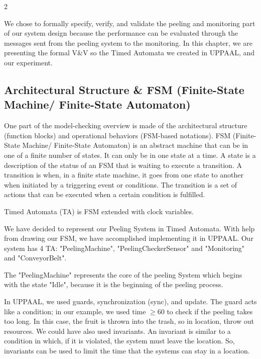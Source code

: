 \documentclass{article}
\begin{document}
\begin{multicols}{2}

\color{black}

We chose to formally specify, verify, and validate the peeling and monitoring part of our system design because the performance can be evaluated through the messages sent from the peeling system to the monitoring.
In this chapter, we are presenting the formal V\&V so the Timed Automata we created in UPPAAL, and our experiment.
\subsection{Architectural Structure \& FSM (Finite-State Machine/ Finite-State Automaton) \cite{b7}}
One part of the model-checking overview is made of the architectural structure (function blocks) and operational behaviors (FSM-based notations).
FSM (Finite-State Machine/ Finite-State Automaton) is an abstract machine that can be in one of a finite number of states. It can only be in one state at a time. A state is a description of the status of an FSM that is waiting to execute a transition. A transition is when, in a finite state machine, it goes from one state to another when initiated by a triggering event or conditions. The transition is a set of actions that can be executed when a certain condition is fulfilled.   

Timed Automata (TA) is FSM extended with clock variables.  

We have decided to represent our Peeling System in Timed Automata. With help from drawing our FSM, we have accomplished implementing it in UPPAAL. Our system has 4 TA: "PeelingMachine", "PeelingCheckerSensor" and "Monitoring" and "ConveyorBelt".  

The "PeelingMachine" represents the core of the peeling System which begins with the state "Idle",  because it is the beginning of the peeling process. 

In UPPAAL, we used guards, synchronization (sync), and update. The guard acts like a condition; in our example, we used time $\geq 60$ to check if the peeling takes too long. In this case, the fruit is thrown into the trash, so in location, throw out resources. We could have also used invariants. An invariant is similar to a condition in which, if it is violated, the system must leave the location. So, invariants can be used to limit the time that the systems can stay in a location.


\end{multicols}
\end{document}

